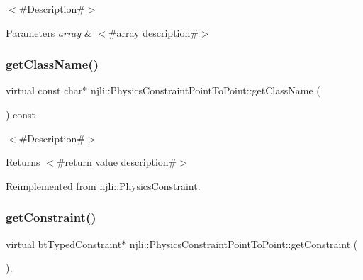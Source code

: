 $<$\#\+Description\#$>$


\begin{DoxyParams}{Parameters}
{\em array} & $<$\#array description\#$>$ \\
\hline
\end{DoxyParams}
\mbox{\label{classnjli_1_1_physics_constraint_point_to_point_a98c21294338cec0671e817ff2c2afc2f}} 
\subsubsection{\texorpdfstring{get\+Class\+Name()}{getClassName()}}
{\footnotesize\ttfamily virtual const char$\ast$ njli\+::\+Physics\+Constraint\+Point\+To\+Point\+::get\+Class\+Name (\begin{DoxyParamCaption}{ }\end{DoxyParamCaption}) const\hspace{0.3cm}{\ttfamily [virtual]}}

$<$\#\+Description\#$>$

\begin{DoxyReturn}{Returns}
$<$\#return value description\#$>$ 
\end{DoxyReturn}


Reimplemented from \mbox{\hyperlink{classnjli_1_1_physics_constraint_a4d31c5267199972942d66b3480374010}{njli\+::\+Physics\+Constraint}}.

\mbox{\label{classnjli_1_1_physics_constraint_point_to_point_ac6660242268a76ff271f041fe22ea52a}} 
\subsubsection{\texorpdfstring{get\+Constraint()}{getConstraint()}\hspace{0.1cm}{\footnotesize\ttfamily [1/2]}}
{\footnotesize\ttfamily virtual bt\+Typed\+Constraint$\ast$ njli\+::\+Physics\+Constraint\+Point\+To\+Point\+::get\+Constraint (\begin{DoxyParamCaption}{ }\end{DoxyParamCaption})\hspace{0.3cm}{\ttfamily [protected]}, {\ttfamily [virtual]}}



